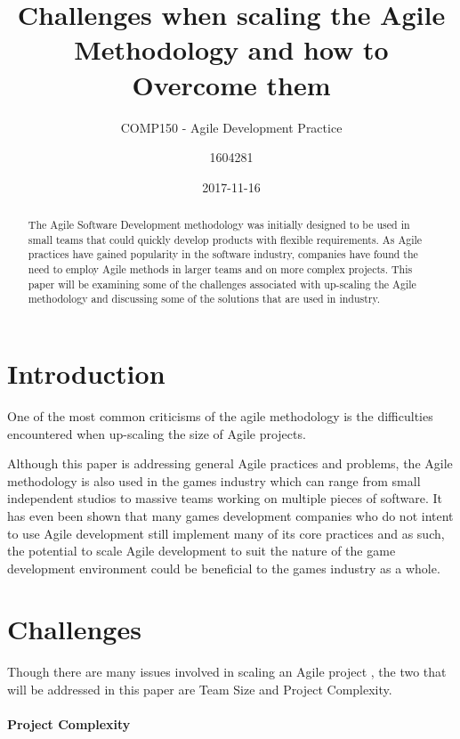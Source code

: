 \documentclass{scrartcl}
\title{Challenges when scaling the Agile Methodology and how to Overcome them}
\subtitle{COMP150 - Agile Development Practice}
\date{2017-11-16}
\author{1604281}
\begin{document}
\maketitle
{}

\begin{abstract}
	The Agile Software Development methodology was initially designed to be used in small teams that could quickly develop products with flexible requirements. As Agile practices have gained popularity in the software industry, companies have found the need to employ Agile methods in larger teams and on more complex projects. This paper will be examining some of the challenges associated with up-scaling the Agile methodology and discussing some of the solutions that are used in industry.
\end{abstract}

\section{Introduction}

 One of the most common criticisms of the agile methodology is the difficulties encountered when up-scaling the size of Agile projects. \cite{begel2007usage}

Although this paper is addressing general Agile practices and problems, the Agile methodology is also used in the games industry \cite{politowski2016old} which can range from small independent studios to massive teams working on multiple pieces of software. It has even been shown that many games development companies who do not intent to use Agile development still implement many of its core practices \cite{petrillo2010agility} and as such, the potential to scale Agile development to suit the nature of the game development environment could be beneficial to the games industry as a whole. 

\section{Challenges}

Though there are many issues involved in scaling an Agile project \cite{turk2014limitations}, the two that will be addressed in this paper are Team Size and Project Complexity. 

\paragraph{Project Complexity}\mbox{}\newline
\end{document}

